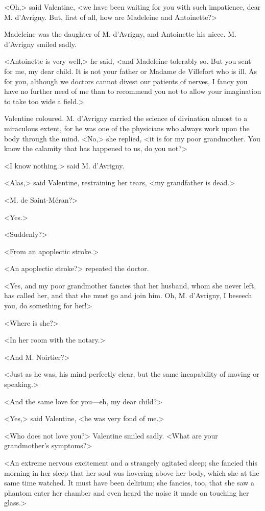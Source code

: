  <Oh,> said Valentine, <we have been waiting for you with such impatience, dear M. d'Avrigny. But, first of all, how are Madeleine and Antoinette?> 

 Madeleine was the daughter of M. d'Avrigny, and Antoinette his niece. M. d'Avrigny smiled sadly. 

 <Antoinette is very well,> he said, <and Madeleine tolerably so. But you sent for me, my dear child. It is not your father or Madame de Villefort who is ill. As for you, although we doctors cannot divest our patients of nerves, I fancy you have no further need of me than to recommend you not to allow your imagination to take too wide a field.> 

 Valentine coloured. M. d'Avrigny carried the science of divination almost to a miraculous extent, for he was one of the physicians who always work upon the body through the mind.  <No,> she replied, <it is for my poor grandmother. You know the calamity that has happened to us, do you not?> 

 <I know nothing.> said M. d'Avrigny. 

 <Alas,> said Valentine, restraining her tears, <my grandfather is dead.> 

 <M. de Saint-Méran?> 

 <Yes.> 

 <Suddenly?> 

 <From an apoplectic stroke.> 

 <An apoplectic stroke?> repeated the doctor. 

 <Yes, and my poor grandmother fancies that her husband, whom she never left, has called her, and that she must go and join him. Oh, M. d'Avrigny, I beseech you, do something for her!> 

 <Where is she?> 

 <In her room with the notary.> 

 <And M. Noirtier?> 

 <Just as he was, his mind perfectly clear, but the same incapability of moving or speaking.> 

 <And the same love for you—eh, my dear child?> 

 <Yes,> said Valentine, <he was very fond of me.> 

 <Who does not love you?> Valentine smiled sadly. <What are your grandmother's symptoms?> 

 <An extreme nervous excitement and a strangely agitated sleep; she fancied this morning in her sleep that her soul was hovering above her body, which she at the same time watched. It must have been delirium; she fancies, too, that she saw a phantom enter her chamber and even heard the noise it made on touching her glass.> 


